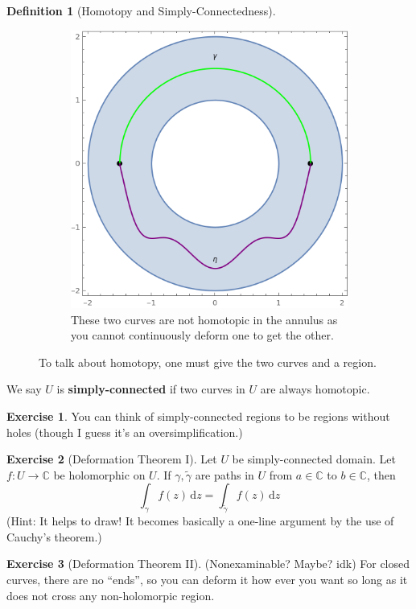 \documentclass[a4paper, 12pt]{article}
\theoremstyle{definition}
\newtheorem{definition}{Definition}
\newtheorem{exercise}{Exercise}
\numberwithin{theorem}{section}
\numberwithin{definition}{section}
\numberwithin{exercise}{section}
\numberwithin{remark}{section}
\numberwithin{figure}{section}
\numberwithin{example}{section}
\newcommand{\C}{\mathbb{C}}
\newcommand{\intd}{\,\text{d}}
\begin{document}
\begin{definition}[Homotopy and Simply-Connectedness]
\begin{figure}[h]
\begin{subfigure}[b]{0.5\textwidth}
            \includegraphics[width=\textwidth]{homotopy2}
            \caption{These two curves are not homotopic in the annulus as you cannot continuously deform one to get the other.}
        \end{subfigure}
        \caption{To talk about homotopy, one must give the two curves and a region.}
        \label{fig: Homotopy}
    \end{figure}
    We say $U$ is \textbf{simply-connected} if two curves in $U$ are always homotopic.
\end{definition}
\begin{exercise}
    You can think of simply-connected regions to be regions without holes
    (though I guess it's an oversimplification.)
\end{exercise}
\begin{exercise}[Deformation Theorem I]
    \label{ex: Deformation Theorem}
    Let $U$ be simply-connected domain.
    Let $f:U \rightarrow \C$ be holomorphic on $U$.
    If $\gamma, \tilde\gamma$ are paths in $U$ from $a \in \C$ to $b \in \C$,
    then
    \begin{equation*}
        \int_{\gamma} f(z) \intd z = \int_{\tilde\gamma} f(z) \intd z
    \end{equation*}
    (Hint: It helps to draw! It becomes basically a one-line argument by the use of Cauchy's theorem.)
\end{exercise}
\begin{exercise}[Deformation Theorem II]
    \label{ex: Deformation Theorem II}
    (Nonexaminable? Maybe? idk)
    For closed curves, there are no ``ends'', so you can deform it how ever you want so long as it does not cross any non-holomorpic region.
\end{exercise}
\end{document}
